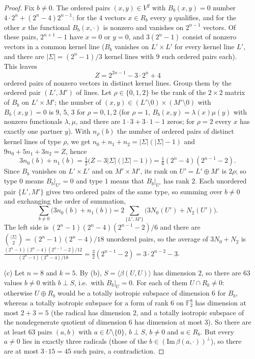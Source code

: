\documentclass[11pt]{article}
\theoremstyle{definition}
\newcommand{\F}{\mathbb{F}}
\begin{document}
\begin{proof}
Fix $b\neq0$. The ordered pairs $(x,y)\in V^2$ with $B_b(x,y)=0$ number
$4\cdot2^n+(2^n-4)2^{n-1}$: for the $4$ vectors $x\in R_b$ every $y$ qualifies, and for the other
$x$ the functional $B_b(x,\cdot)$ is nonzero and vanishes on $2^{n-1}$ vectors. Of these pairs,
$2^{n+1}-1$ have $x=0$ or $y=0$, and $3(2^n-1)$ consist of nonzero vectors in a common kernel
line ($B_b$ vanishes on $L'\times L'$ for every kernel line $L'$, and there are
$|\Sigma|=(2^n-1)/3$ kernel lines with $9$ such ordered pairs each). This leaves
\[
Z=2^{2n-1}-3\cdot2^n+4
\]
ordered pairs of nonzero vectors in distinct kernel lines. Group them by the ordered pair
$(L',M')$ of lines. Let $\rho\in\{0,1,2\}$ be the rank of the $2\times2$ matrix of $B_b$ on
$L'\times M'$; the number of $(x,y)\in(L'\setminus0)\times(M'\setminus0)$ with $B_b(x,y)=0$ is
$9$, $5$, $3$ for $\rho=0,1,2$ (for $\rho=1$, $B_b(x,y)=\lambda(x)\mu(y)$ with nonzero functionals
$\lambda,\mu$, and there are $1\cdot3+3\cdot1-1$ zeros; for $\rho=2$ every $x$ has exactly one
partner $y$). With $n_\rho(b)$ the number of ordered pairs of distinct kernel lines of type $\rho$, we
get $n_0+n_1+n_2=|\Sigma|(|\Sigma|-1)$ and $9n_0+5n_1+3n_2=Z$, hence
\[
3n_0(b)+n_1(b)=\tfrac12\bigl(Z-3|\Sigma|(|\Sigma|-1)\bigr)=\tfrac16(2^n-4)(2^{n-1}-2).
\]
Since $B_b$ vanishes on $L'\times L'$ and on $M'\times M'$, its rank on $U'=L'\oplus M'$ is $2\rho$;
so type $0$ means $B_b|_{U'}=0$ and type $1$ means that $B_b|_{U'}$ has rank $2$. Each unordered
pair $\{L',M'\}$ gives two ordered pairs of the same type, so summing over $b\neq0$ and
exchanging the order of summation,
\[
\sum_{b\neq0}\bigl(3n_0(b)+n_1(b)\bigr)=2\sum_{\{L',M'\}}\bigl(3N_0(U')+N_2(U')\bigr).
\]
The left side is $(2^n-1)(2^n-4)(2^{n-1}-2)/6$ and there are $\binom{|\Sigma|}{2}=(2^n-1)(2^n-4)/18$
unordered pairs, so the average of $3N_0+N_2$ is
$\frac{(2^n-1)(2^n-4)(2^{n-1}-2)/12}{(2^n-1)(2^n-4)/18}=\frac32(2^{n-1}-2)=3\cdot2^{n-2}-3$.

(c) Let $n=8$ and $k=5$. By (b), $S=\langle\beta(U,U)\rangle$ has dimension $2$, so there are $63$
values $b\neq0$ with $b\perp S$, i.e.\ with $B_b|_U=0$. For each of them $U\cap R_b\neq0$:
otherwise $U\oplus R_b$ would be a totally isotropic subspace of dimension $6$ for $B_b$, whereas
a totally isotropic subspace for a form of rank $6$ on $\F_2^8$ has dimension at most $2+3=5$
(the radical has dimension $2$, and a totally isotropic subspace of the nondegenerate quotient
of dimension $6$ has dimension at most $3$). So
there are at least $63$ pairs $(a,b)$ with $a\in U\setminus\{0\}$, $b\perp S$, $b\ne0$ and $a\in R_b$.
But every $a\neq0$ lies in exactly three radicals (those of the $b\in(\mathrm{Im}\,\beta(a,\cdot))^\perp$),
so there are at most $3\cdot15=45$ such pairs, a contradiction.
\end{proof}
\end{document}
